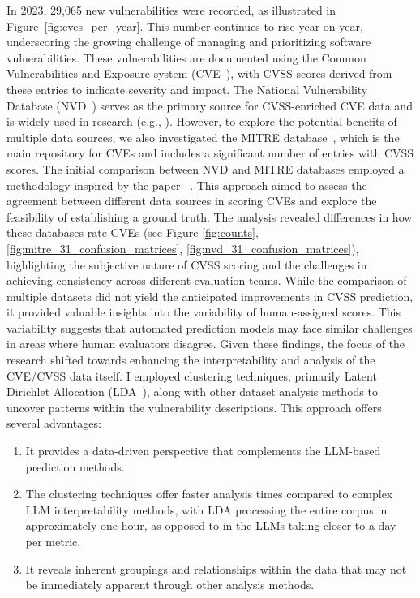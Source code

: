 \documentclass[12pt]{article}
\begin{document}
In 2023, 29,065 new vulnerabilities were recorded, as illustrated in Figure~\ref{fig:cves_per_year}.
This number continues to rise year on year, underscoring the growing challenge of managing and
prioritizing software vulnerabilities. These vulnerabilities are documented using the Common
Vulnerabilities and Exposure system (CVE~\cite{CVE}), with CVSS scores derived from these entries to
indicate severity and impact. The National Vulnerability Database (NVD~\cite{NVD}) serves as the
primary source for CVSS-enriched CVE data and is widely used in research (e.g., \cite{costa,
	nvd_example1, nvd_example2}). However, to explore the potential benefits of multiple data sources,
we also investigated the MITRE database~\cite{MITRE}, which is the main repository for CVEs and
includes a significant number of entries with CVSS scores. The initial comparison between NVD and
MITRE databases employed a methodology inspired by the paper ~\cite{bayes}. This approach aimed to assess the
agreement between different data sources in scoring CVEs and explore the feasibility of establishing
a ground truth. The analysis revealed differences in how these databases rate CVEs (see Figure
\ref{fig:counts}, \ref{fig:mitre_31_confusion_matrices}, \ref{fig:nvd_31_confusion_matrices}), highlighting the subjective nature of CVSS scoring and the challenges in
achieving consistency across different evaluation teams. While the comparison of multiple datasets
did not yield the anticipated improvements in CVSS prediction, it provided valuable insights into
the variability of human-assigned scores. This variability suggests that automated prediction models
may face similar challenges in areas where human evaluators disagree. Given these findings, the
focus of the research shifted towards enhancing the interpretability and analysis of the CVE/CVSS
data itself. I employed clustering techniques, primarily Latent Dirichlet Allocation
(LDA~\cite{lda_origin}), along with other dataset analysis methods to uncover patterns within the
vulnerability descriptions. This approach offers several advantages:

\begin{enumerate}

	\item It provides a data-driven perspective that complements the LLM-based prediction methods.

	\item The clustering techniques offer faster analysis times compared to complex LLM interpretability
	      methods, with LDA processing the entire corpus in approximately one hour, as opposed to in
	      the LLMs taking closer to a day per metric.

	\item It reveals inherent groupings and relationships within the data that may not be immediately apparent
	      through other analysis methods.

\end{enumerate}
\end{document}
